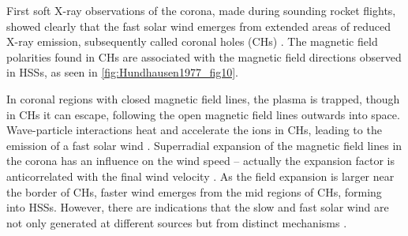 First soft X-ray observations of the corona, made during sounding rocket flights, showed clearly that the fast solar wind emerges from extended areas of reduced X-ray emission, subsequently called coronal holes (CHs) \citep{Krieger1973,Hundhausen1977}. The magnetic field polarities found in CHs are associated with the magnetic field directions observed in HSSs, as seen in \autoref{fig:Hundhausen1977_fig10}.
\begin{figure}[htb]
\end{figure}
In coronal regions with closed magnetic field lines, the plasma is trapped, though in CHs it can escape, following the open magnetic field lines outwards into space. Wave-particle interactions heat and accelerate the ions in CHs, leading to the emission of a fast solar wind \citep{Hollweg2002}. Superradial expansion of the magnetic field lines in the corona has an influence on the wind speed -- actually the expansion factor is anticorrelated with the final wind velocity \citep{Wang1990}. As the field expansion is larger near the border of CHs, faster wind emerges from the mid regions of CHs, forming into HSSs. However, there are indications that the slow and fast solar wind are not only generated at different sources but from distinct mechanisms \citep{McGregor2011b}.


